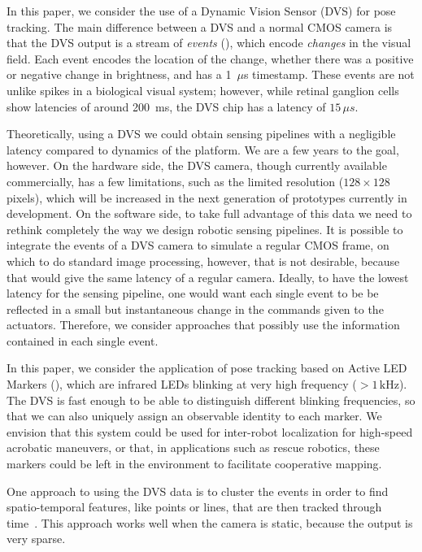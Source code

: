 In this paper, we consider the use of a Dynamic Vision Sensor (DVS)
for pose tracking. The main difference between a DVS and a normal
CMOS camera is that the DVS output is a stream of \emph{events} (),
which encode \emph{changes} in the visual field. Each event encodes
the location of the change, whether there was a positive or negative
change in brightness, and has a 1~$\mu$s timestamp.  These events
are not unlike spikes in a biological visual system; however, while
retinal ganglion cells show latencies of around 200~ms, the DVS chip
has a latency of $15\,\mu s$.

Theoretically, using a DVS we could obtain sensing pipelines with
a negligible latency compared to dynamics of the platform. We are
a few years to the goal, however. On the hardware side, the DVS camera,
though currently available commercially, has a few limitations, such
as the limited resolution ($128\times128$ pixels), which  will
be increased in the next generation of prototypes currently in development.
On the software side, to take full advantage of this data we need
to rethink completely the way we design robotic sensing pipelines.
It is possible to integrate the events of a DVS camera to simulate
a regular CMOS frame, on which to do standard image processing, however,
that is not desirable, because that would give the same latency of
a regular camera. Ideally, to have the lowest latency for the sensing
pipeline, one would want each single event to be be reflected in a
small but instantaneous change in the commands given to the actuators.
Therefore, we consider approaches that possibly use the information
contained in each single event.

In this paper, we consider the application of pose tracking based
on Active LED Markers (\ALMs), which are infrared LEDs blinking at
very high frequency ($>1\,\mbox{kHz}$). The DVS is fast enough to
be able to distinguish different blinking frequencies, so that we
can also uniquely assign an observable identity to each marker. We
envision that this system could be used for inter-robot localization
for high-speed acrobatic maneuvers, or that, in applications such
as rescue robotics, these markers could be left in the environment
to facilitate cooperative mapping.

One approach to using the DVS data is to cluster the events in order
to find spatio-temporal features, like points or lines, that are then
tracked through time~\cite{delbruck07fast,conradt09pencil}. This
approach works well when the camera is static, because the output
is very sparse. 

